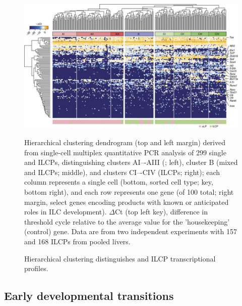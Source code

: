 \begin{figure}[h]
\begin{center}
	\includegraphics[width=\textwidth]{figures/chapter3/F3}
\end{center}
	\caption{Hierarchical clustering distinguishes \aLP and ILCP transcriptional profiles.} 
	Hierarchical clustering dendrogram (top and left margin) derived from single-cell multiplex quantitative PCR analysis of 299 single \aLPs and ILCPs, distinguishing clusters AI–-AIII (\aLPs; left), cluster B (mixed \aLPs and ILCPs; middle), and clusters CI–-CIV (ILCPs; right); each column represents a single cell (bottom, sorted cell type; key, bottom right), and each row represents one gene (of 100 total; right margin, select genes encoding products with known or anticipated roles in ILC development). $\Delta$Ct (top left key), difference in threshold cycle relative to the average value for the 'housekeeping' (control) gene. Data are from two independent experiments with 157 \aLPs and 168 ILCPs from pooled livers.
	\label{fig:chap3_F3}
\end{figure}

\subsection{Early developmental transitions}

